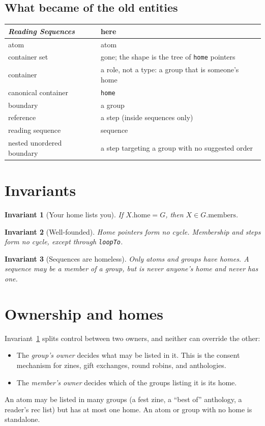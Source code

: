 \documentclass{amsart}
\newtheorem{inv}{Invariant}
\theoremstyle{remark}
\begin{document}
\subsection*{What became of the old entities}
\begin{center}\small
\begin{tabular}{ll}
\emph{Reading Sequences} & here \\ \hline
atom & atom \\
container set & gone; the shape is the tree of \lstinline|home| pointers \\
container & a role, not a type: a group that is someone's home \\
canonical container & \lstinline|home| \\
boundary & a group \\
reference & a step (inside sequences only) \\
reading sequence & sequence \\
nested unordered boundary & a step targeting a group with no suggested order \\
\end{tabular}
\end{center}

\section{Invariants}
\begin{inv}[Your home lists you]\label{inv:home}If $X.\mathrm{home} = G$, then $X \in G.\mathrm{members}$.\end{inv}
\begin{inv}[Well-founded]\label{inv:acyclic}Home pointers form no cycle. Membership and steps form no cycle, except through \lstinline|loopTo|.\end{inv}
\begin{inv}[Sequences are homeless]Only atoms and groups have homes. A sequence may be a member of a group, but is never anyone's home and never has one.\end{inv}

\section{Ownership and homes}
Invariant~\ref{inv:home} splits control between two owners, and neither can override the other:
\begin{itemize}
  \item The \emph{group's owner} decides what may be listed in it. This is the consent mechanism for zines, gift exchanges, round robins, and anthologies.
  \item The \emph{member's owner} decides which of the groups listing it is its home.
\end{itemize}
An atom may be listed in many groups (a fest zine, a ``best of'' anthology, a reader's rec list) but has at most one home. An atom or group with no home is standalone.
\end{document}
